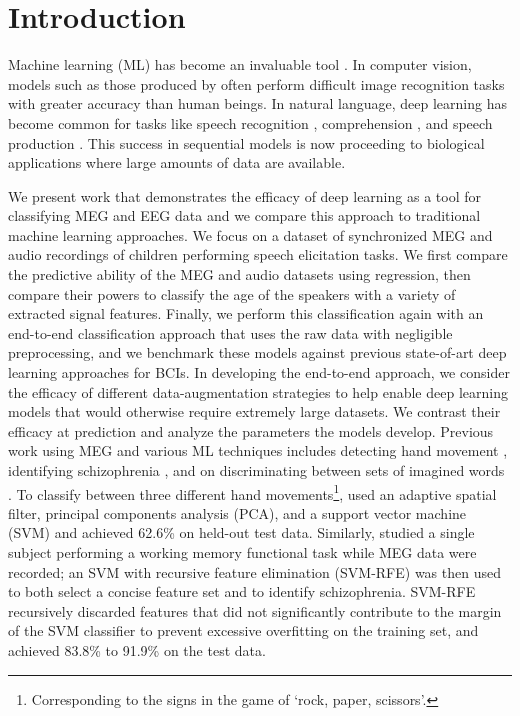 \documentclass[utf8]{frontiersSCNS} %
\begin{document}
\section{Introduction}


Machine learning (ML) has become an invaluable tool \cite{LeCun2015}. In computer vision, models such as those produced by \cite{He2015a} often perform difficult image recognition tasks with greater accuracy than  human beings. In natural language, deep learning has become common for tasks like speech recognition \cite{Bahdanau}, comprehension \cite{Moritz}, and speech production \cite{VanDenOord}. This success in sequential models is now proceeding to biological applications where large amounts of data are available. %

We present work that demonstrates the efficacy of deep learning as a tool for classifying MEG and EEG data and we compare this approach to traditional machine learning approaches. We focus on a dataset of synchronized MEG and audio recordings of children performing speech elicitation tasks. We first compare the predictive ability of the MEG and audio datasets using regression, then compare their powers to classify the age of the speakers with a variety of extracted signal features. Finally, we perform this classification again with an end-to-end classification approach that uses the raw data with negligible preprocessing, and we benchmark these models against previous state-of-art deep learning approaches for BCIs. In developing the end-to-end approach, we consider the efficacy of different data-augmentation strategies to help enable deep learning models that would otherwise require extremely large datasets. We contrast their efficacy at prediction and analyze the parameters the models develop. Previous work using MEG and various ML techniques includes detecting hand movement \cite{Asano2009}, identifying schizophrenia \cite{Ince2008}, and on discriminating between sets of imagined words \cite{Guimaraes2007}. To classify between three different hand movements\footnote{Corresponding to the signs in the game of `rock, paper, scissors'.}, \cite{Asano2009} used an adaptive spatial filter, principal components analysis (PCA), and a support vector machine (SVM) and achieved 62.6\% on held-out test data. Similarly, \cite{Ince2008} studied a single subject performing a working memory functional task while MEG data were recorded; an SVM with recursive feature elimination (SVM-RFE) was then used to both select a concise feature set and to identify schizophrenia. SVM-RFE recursively discarded features that did not significantly contribute to the margin of the SVM classifier to prevent excessive overfitting on the training set, and achieved 83.8\% to 91.9\% on the test data.
\end{document}
